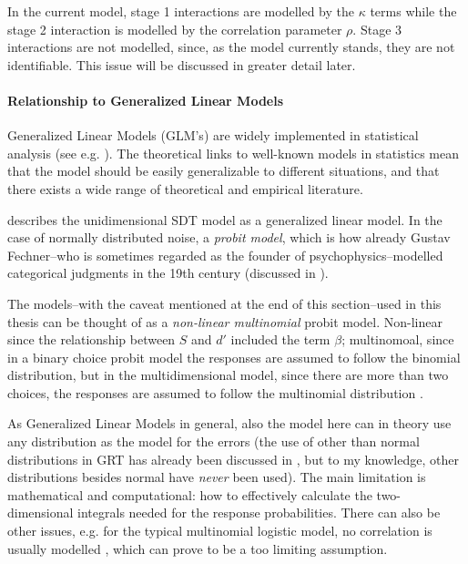 \documentclass{article}\usepackage{knitr}
\begin{document}
In the current model, stage 1 interactions are modelled by the $\kappa$ terms while the stage 2 interaction is modelled by the correlation parameter $\rho$. Stage 3 interactions are not modelled, since, as the model currently stands, they are not identifiable. This issue will be discussed in greater detail later. 

\paragraph{Relationship to Generalized Linear Models}

Generalized Linear Models (GLM's) are widely implemented in statistical analysis (see e.g. \citet{kruschke2015, skrondahl2004}). The theoretical links to well-known models in statistics mean that the model should be easily generalizable to different situations, and that there exists a wide range of theoretical and empirical literature. 
 
\cite{decarlo1998} describes the unidimensional SDT model as a generalized linear model. In the case of normally distributed noise, a \textit{probit model}, which is how already Gustav Fechner--who is sometimes regarded as the founder of psychophysics--modelled categorical judgments in the 19th century (discussed in \citealt[Chapter 7]{stigler2003}). 

The models--with the caveat mentioned at the end of this section--used in this thesis can be thought of as a \textit{non-linear multinomial} probit model. Non-linear \citep[p. 379]{box2005} since the relationship between $S$ and $d'$ included the term $\beta$; multinomoal, since in a binary choice probit model the responses are assumed to follow the binomial distribution, but in the multidimensional model, since there are more than two choices, the responses are assumed to follow the multinomial distribution \cite[p. ERROR]{skrondahl2004}. 

As Generalized Linear Models in general, also the model here can in theory use any distribution as the model for the errors (the use of other than normal distributions in GRT has already been discussed in \citet{ashby1986}, but to my knowledge, other distributions besides normal have \textit{never} been used). The main limitation is mathematical and computational: how to effectively calculate the two-dimensional integrals needed for the response probabilities. There can also be other issues, e.g. for the  typical multinomial logistic model, no correlation is usually modelled \citep{skrondahl2004}, which can prove to be a too limiting assumption.
\end{document}
